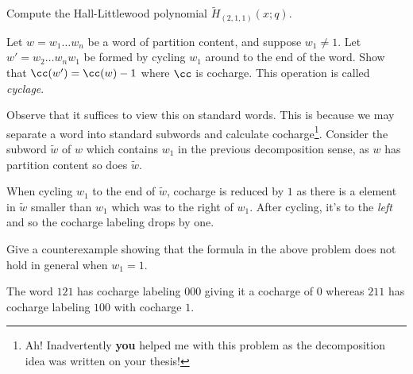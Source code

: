 \documentclass[12pt]{memoir}
\begin{document}
\begin{Ej}
    Compute the Hall-Littlewood polynomial $\tilde{H}_{(2,1,1)}(x;q)$.
\end{Ej}

\begin{Ej}
    Let $w=w_1\dots w_n$ be a word of partition content, and suppose $w_1\neq 1$. Let $w'=w_2\dots w_nw_1$ be formed by cycling $w_1$ around to the end of the word. Show that $\cc(w')=\cc(w)-1$ where $\cc$ is cocharge. This operation is called \emph{cyclage}.
\end{Ej}

\begin{ptcbr}
Observe that it suffices to view this on standard words. This is because we may separate a word into standard subwords and calculate cocharge\footnote{Ah! Inadvertently \textbf{you} helped me with this problem as the decomposition idea was written on your thesis!}. Consider the subword $\tilde{w}$ of $w$ which contains $w_1$ in the previous decomposition sense, as $w$ has partition content so does $\tilde{w}$.\par
When cycling $w_1$ to the end of $\tilde{w}$, cocharge is reduced by $1$ as there is a element in $\tilde{w}$ smaller than $w_1$ which was to the right of $w_1$. After cycling, it's to the \emph{left} and so the cocharge labeling drops by one. 
\end{ptcbr}

\begin{Ej}
    Give a counterexample showing that the formula in the above problem does not hold in general when $w_1=1$.
\end{Ej}

\begin{ptcbr}
The word $121$ has cocharge labeling $000$ giving it a cocharge of $0$ whereas $211$ has cocharge labeling $100$ with cocharge $1$.
\end{ptcbr}
\end{document}
